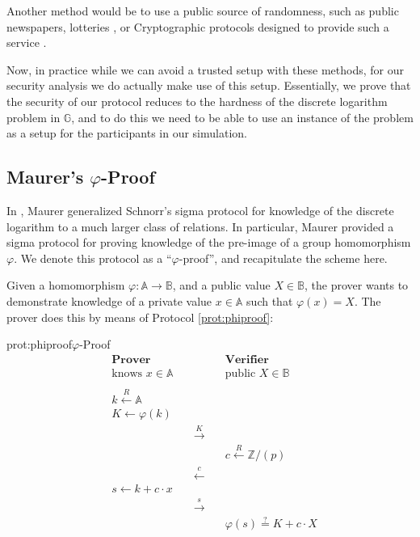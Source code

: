 Another method would be to use a public source of randomness,
such as public newspapers, lotteries
\cite{baigneres_trap_2015}, or Cryptographic protocols
designed to provide such a service \cite{fischer_public_2011}.

Now, in practice while we can avoid a trusted setup with these methods,
for our security analysis we do actually make use of this setup.
Essentially, we prove that the security of our protocol reduces
to the hardness of the discrete logarithm problem in $\mathbb{G}$,
and to do this we need to be able to use an instance of the problem
as a setup for the participants in our simulation.

\subsection{Maurer's \texorpdfstring{$\varphi$}{varphi}-Proof}
\label{sec:maurer}

In \cite{maurer_unifying_2009}, Maurer generalized Schnorr's sigma 
protocol for knowledge of the discrete logarithm \cite{schnorr_efficient_1990} to a much larger class
of relations. In particular, Maurer provided a sigma protocol for
proving knowledge of the pre-image of a group homomorphism $\varphi$.
We denote this protocol as a ``$\varphi$-proof'', and recapitulate the scheme
here.

Given a homomorphism $\varphi : \mathbb{A} \to \mathbb{B}$, and a public value
$X \in \mathbb{B}$, the prover wants to demonstrate knowledge of a private
value $x \in \mathbb{A}$ such that $\varphi(x) = X$. The prover
does this by means of Protocol \ref{prot:phiproof}:

\begin{aprotocol}{prot:phiproof}{$\varphi$-Proof}
\[
\begin{aligned}
    &\textbf{Prover}&&\textbf{Verifier}\\
    &\text{knows } x \in \mathbb{A}&&\text{public } X \in \mathbb{B}\\
    \\
    &k \xleftarrow{R} \mathbb{A}&\\
    &K \gets \varphi(k)&\\
    &&\quad\overset{K}{\longrightarrow}\quad\\
    &&&c \xleftarrow{R} \mathbb{Z}/(p)\\
    &&\quad\overset{c}{\longleftarrow}\quad\\
    &s \gets k + c \cdot x\\
    &&\quad\overset{s}{\longrightarrow}\quad\\
    &&& \varphi(s) \overset{?}{=} K + c \cdot X\\
\end{aligned}
\]
\end{aprotocol}

